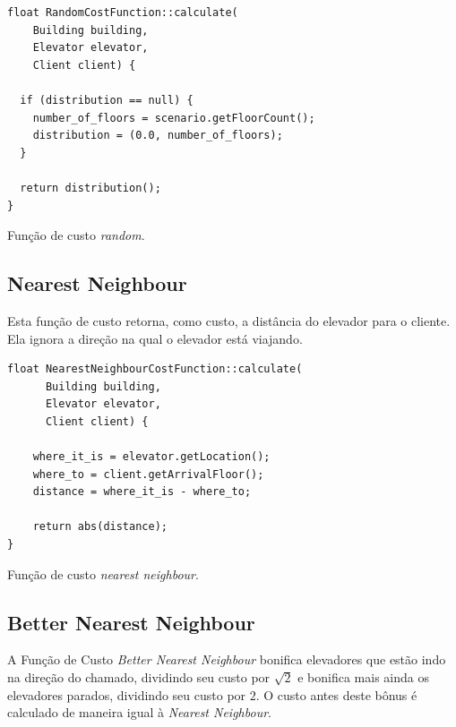 \begin{algorithm}[htb!]
  \centering
  \begin{verbatim}
float RandomCostFunction::calculate(
    Building building,
    Elevator elevator,
    Client client) {

  if (distribution == null) {
    number_of_floors = scenario.getFloorCount();
    distribution = (0.0, number_of_floors);
  }

  return distribution();
}
  \end{verbatim}
  \caption{\label{alg:random_cf}Função de custo \textit{random}.}
\end{algorithm}

\subsection{\label{model:costfunctions:nn}Nearest Neighbour}
Esta função de custo retorna, como custo, a distância do
elevador para o cliente. Ela ignora a direção na qual o elevador está viajando.

\begin{algorithm}[htb!]
  \centering
  \begin{verbatim}
float NearestNeighbourCostFunction::calculate(
      Building building,
      Elevator elevator,
      Client client) {

    where_it_is = elevator.getLocation();
    where_to = client.getArrivalFloor();
    distance = where_it_is - where_to;

    return abs(distance);
}
  \end{verbatim}
  \caption{\label{alg:nn_cf}Função de custo \textit{nearest neighbour}.}
\end{algorithm}

\subsection{\label{model:costfunctions:bnn}Better Nearest Neighbour}
A Função de Custo \textit{Better Nearest Neighbour} bonifica elevadores que
estão indo na direção do chamado, dividindo seu custo por $\sqrt 2$ e bonifica
mais ainda os elevadores parados, dividindo seu custo por $2$. O custo antes
deste bônus é calculado de maneira igual à \textit{Nearest Neighbour}.

